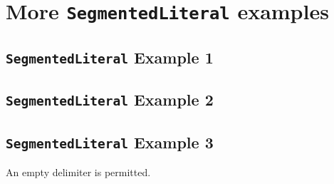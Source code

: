 \chapter{More \texttt{SegmentedLiteral} examples}

\section{\texttt{SegmentedLiteral} Example 1}



\section{\texttt{SegmentedLiteral} Example 2}



\section{\texttt{SegmentedLiteral} Example 3}
\begin{minipage}{\linewidth}

An empty delimiter is permitted.
\vspace{1em}


\end{minipage}
